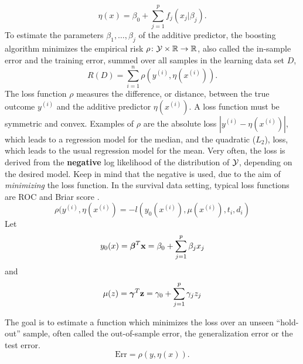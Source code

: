\begin{equation}\label{eq:eta-componentwise}
    \eta(x)=\beta_0+\sum_{j=1}^pf_j(x_j|\beta_j).
\end{equation}
To estimate the parameters $\beta_1,\ldots,\beta_j$ of the additive predictor, the boosting algorithm minimizes the empirical risk $\rho\colon\mathcal{Y}\times\mathbb{R}\to\mathbb{R}$, also called the in-sample error and the training error, summed over all samples in the learning data set $D$,
\begin{equation}
    R(D)=\sum_{i=1}^n\rho(y^{(i)},\eta(x^{(i)})).
\end{equation}
The loss function $\rho$ measures the difference, or distance, between the true outcome $y^{(i)}$ and the additive predictor $\eta(x^{(i)})$. A loss function must be symmetric and convex. Examples of $\rho$ are the absolute loss $|y^{(i)}-\eta(x^{(i)})|$, which leads to a regression model for the median, and the quadratic ($L_2$), loss, which leads to the usual regression model for the mean. Very often, the loss is derived from the \textbf{negative} log likelihood of the distribution of $\mathcal{Y}$, depending on the desired model. Keep in mind that the negative is used, due to the aim of \textit{minimizing} the loss function. In the survival data setting, typical loss functions are ROC and Briar score \citep{bovelstadborgan}.
\begin{equation}
    \rho(y^{(i)},\eta(x^{(i)})=-l(y_0(x^{(i)}), \mu(x^{(i)}), t_i, d_i)
\end{equation}
Let
\begin{equation}
    y_0(x)=\boldsymbol{\beta}^T\mathbf{x}=\beta_0+\sum_{j=1}^p \beta_jx_j
\end{equation}
and
\begin{equation}
    \mu(z)=\boldsymbol{\gamma}^T\mathbf{z}=\gamma_0+\sum_{j=1}^p \gamma_jz_j
\end{equation}

The goal is to estimate a function which minimizes the loss over an unseen ``hold-out'' sample, often called the out-of-sample error, the generalization error or the test error.
\begin{equation}
    \text{Err}=\rho(y,\eta(x)).
\end{equation}

